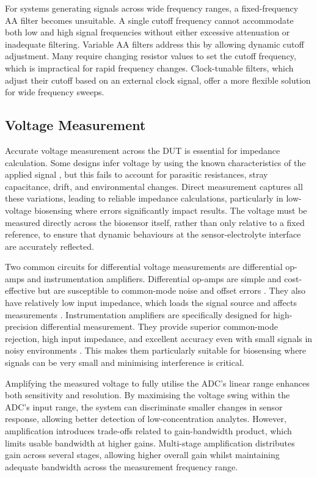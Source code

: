 For systems generating signals across wide frequency ranges, a fixed-frequency AA filter becomes unsuitable. A single cutoff frequency cannot accommodate both low and high signal frequencies without either excessive attenuation or inadequate filtering. Variable AA filters address this by allowing dynamic cutoff adjustment. Many require changing resistor values to set the cutoff frequency, which is impractical for rapid frequency changes. Clock-tunable filters, which adjust their cutoff based on an external clock signal, offer a more flexible solution for wide frequency sweeps.

\subsection{Voltage Measurement}
Accurate voltage measurement across the \ac{DUT} is essential for impedance calculation. Some designs infer voltage by using the known characteristics of the applied signal \cite{buscagliaSimpleZLowCostPortable2023}, but this fails to account for parasitic resistances, stray capacitance, drift, and environmental changes. Direct measurement captures all these variations, leading to reliable impedance calculations, particularly in low-voltage biosensing where errors significantly impact results. The voltage must be measured directly across the biosensor itself, rather than only relative to a fixed reference, to ensure that dynamic behaviours at the sensor-electrolyte interface are accurately reflected.

Two common circuits for differential voltage measurements are differential op-amps and instrumentation amplifiers. Differential op-amps are simple and cost-effective but are susceptible to common-mode noise and offset errors \cite{technologyWhatAreDrawbacks2024}. They also have relatively low input impedance, which loads the signal source and affects measurements \cite{technologyWhatAreDrawbacks2024}. Instrumentation amplifiers are specifically designed for high-precision differential measurement. They provide superior common-mode rejection, high input impedance, and excellent accuracy even with small signals in noisy environments \cite{InstrumentationAmplifierOperational}. This makes them particularly suitable for biosensing where signals can be very small and minimising interference is critical.

Amplifying the measured voltage to fully utilise the \ac{ADC}'s linear range enhances both sensitivity and resolution. By maximising the voltage swing within the \ac{ADC}'s input range, the system can discriminate smaller changes in sensor response, allowing better detection of low-concentration analytes. However, amplification introduces trade-offs related to gain-bandwidth product, which limits usable bandwidth at higher gains. Multi-stage amplification distributes gain across several stages, allowing higher overall gain whilst maintaining adequate bandwidth across the measurement frequency range.

